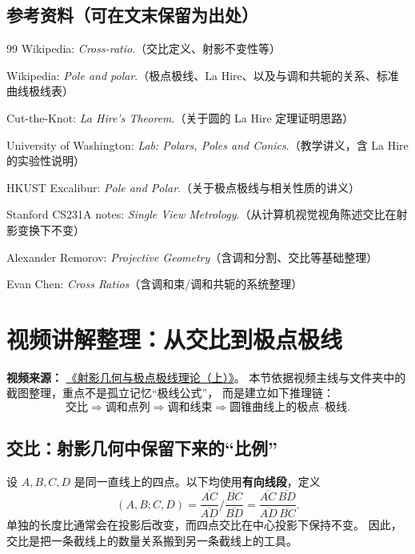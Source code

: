 \documentclass[UTF8]{ctexart}
\begin{document}
	\subsection{参考资料（可在文末保留为出处）}
	\begin{thebibliography}{99}
		Wikipedia: \textit{Cross-ratio}.（交比定义、射影不变性等）
		
		Wikipedia: \textit{Pole and polar}.（极点极线、La Hire、以及与调和共轭的关系、标准曲线极线表）
		
		Cut-the-Knot: \textit{La Hire's Theorem}.（关于圆的 La Hire 定理证明思路）
		
		University of Washington: \textit{Lab: Polars, Poles and Conics}.（教学讲义，含 La Hire 的实验性说明）
		
		HKUST Excalibur: \textit{Pole and Polar}.（关于极点极线与相关性质的讲义）
		
		Stanford CS231A notes: \textit{Single View Metrology}.（从计算机视觉视角陈述交比在射影变换下不变）
		
		Alexander Remorov: \textit{Projective Geometry}（含调和分割、交比等基础整理）
		
		Evan Chen: \textit{Cross Ratios}（含调和束/调和共轭的系统整理）
	\end{thebibliography}
	
	

	\section{视频讲解整理：从交比到极点极线}
	
	\noindent\textbf{视频来源：}
	\href{https://www.bilibili.com/video/BV1Me411o7ku/}
	{《射影几何与极点极线理论（上）》}。
	本节依据视频主线与文件夹中的截图整理，重点不是孤立记忆“极线公式”，
	而是建立如下推理链：
	\[
	\boxed{\text{交比}}
	\Longrightarrow
	\boxed{\text{调和点列}}
	\Longrightarrow
	\boxed{\text{调和线束}}
	\Longrightarrow
	\boxed{\text{圆锥曲线上的极点--极线}}.
	\]
	
	\subsection{交比：射影几何中保留下来的“比例”}
	
	设 $A,B,C,D$ 是同一直线上的四点。以下均使用\textbf{有向线段}，定义
	\[
	(A,B;C,D)
	=
	\frac{\overline{AC}}{\overline{AD}}
	\Bigg/
	\frac{\overline{BC}}{\overline{BD}}
	=
	\frac{\overline{AC}\,\overline{BD}}
	     {\overline{AD}\,\overline{BC}}.
	\]
	单独的长度比通常会在投影后改变，而四点交比在中心投影下保持不变。
	因此，交比是把一条截线上的数量关系搬到另一条截线上的工具。
	
\end{document}

